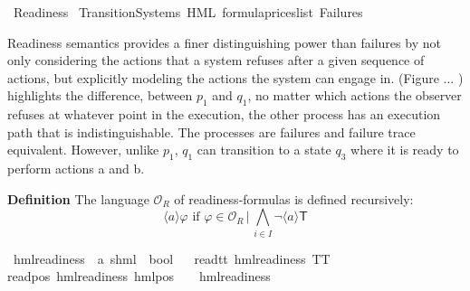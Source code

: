 %
\begin{isabellebody}%
%
%
\isadelimtheory
%
\endisadelimtheory
%
\isatagtheory
{}\isamarkupfalse%
\ Readiness\isanewline
{}\ Transition{\isacharunderscore}{\kern0pt}Systems\ HML\ formula{\isacharunderscore}{\kern0pt}prices{\isacharunderscore}{\kern0pt}list\ Failures\isanewline
{}%
\endisatagtheory
{\isafoldtheory}%
%
\isadelimtheory
%
\endisadelimtheory
%
\isadelimdocument
%
\endisadelimdocument
%
\isatagdocument
%
\isamarkuptrue%
%
\endisatagdocument
{\isafolddocument}%
%
\isadelimdocument
%
\endisadelimdocument
%
\begin{isamarkuptext}%
Readiness semantics provides a finer distinguishing power than failures by not only considering the actions that a system refuses after a given sequence of actions, but explicitly modeling the actions the system can engage in.
(Figure ... ) highlights the difference, between $p_1$ and $q_1$, no matter which actions the observer refuses at whatever point in the execution, the other process has an execution path that is indistinguishable. The processes are failures and failure trace equivalent.
However, unlike $p_1$, $q_1$ can transition to a state $q_3$ where it is ready to perform actions a and b.%
\end{isamarkuptext}\isamarkuptrue%
%
\begin{isamarkuptext}%
\textbf{Definition} The language $\mathcal{O}_R$ of readiness-formulas is defined recursively:
$$\langle a \rangle \varphi \text{ if } \varphi \in \mathcal{O}_R \,|\, \bigwedge_{i\in I}\lnot\langle a \rangle \textsf{T}$$%
\end{isamarkuptext}\isamarkuptrue%
\isamarkupfalse%
\ hml{\isacharunderscore}{\kern0pt}readiness\ {\isacharcolon}{\kern0pt}{\isacharcolon}{\kern0pt}\ {\isachardoublequoteopen}{\isacharparenleft}{\kern0pt}{\isacharprime}{\kern0pt}a{\isacharcomma}{\kern0pt}\ {\isacharprime}{\kern0pt}s{\isacharparenright}{\kern0pt}hml\ {\isasymRightarrow}\ bool{\isachardoublequoteclose}\isanewline
\ \ \isanewline
read{\isacharunderscore}{\kern0pt}tt{\isacharcolon}{\kern0pt}\ {\isachardoublequoteopen}hml{\isacharunderscore}{\kern0pt}readiness\ TT{\isachardoublequoteclose}\ {\isacharbar}{\kern0pt}\isanewline
read{\isacharunderscore}{\kern0pt}pos{\isacharcolon}{\kern0pt}\ {\isachardoublequoteopen}hml{\isacharunderscore}{\kern0pt}readiness\ {\isacharparenleft}{\kern0pt}hml{\isacharunderscore}{\kern0pt}pos\ {\isasymalpha}\ {\isasymphi}{\isacharparenright}{\kern0pt}{\isachardoublequoteclose}\ \ {\isachardoublequoteopen}hml{\isacharunderscore}{\kern0pt}readiness\ {\isasymphi}{\isachardoublequoteclose}\ {\isacharbar}{\kern0pt}\isanewline

\end{isabellebody}
